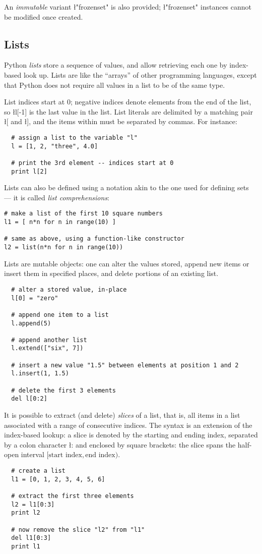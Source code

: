 An \emph{immutable} variant \l"frozenset" is also provided;
\l"frozenset" instances cannot be modified once created.

                                                               
\subsection{Lists}
\label{sec:lists}

Python \emph{lists} store a sequence of values, and allow retrieving
each one by index-based look up.  Lists are like the ``arrays'' of
other programming languages, except that Python does not require all
values in a list to be of the same type.

List indices start at 0; negative indices denote elements from the end
of the list, so \l{l[-1]} is the last value in the list.  List
literals are delimited by a matching pair \l{[} and \l{]}, and the
items within must be separated by commas. For instance:
\begin{lstlisting}
  # assign a list to the variable "l"
  l = [1, 2, "three", 4.0]

  # print the 3rd element -- indices start at 0
  print l[2]
\end{lstlisting}
Lists can also be defined using a notation akin to the one used for
defining sets --- it is called \emph{list comprehensions}:
\begin{lstlisting}
# make a list of the first 10 square numbers
l1 = [ n*n for n in range(10) ]

# same as above, using a function-like constructor
l2 = list(n*n for n in range(10))
\end{lstlisting}

Lists are mutable objects: one can alter the values stored, append new
items or insert them in specified places, and delete portions of an
existing list.
\begin{lstlisting}
  # alter a stored value, in-place
  l[0] = "zero"

  # append one item to a list
  l.append(5)

  # append another list
  l.extend(["six", 7])

  # insert a new value "1.5" between elements at position 1 and 2
  l.insert(1, 1.5)

  # delete the first 3 elements
  del l[0:2]
\end{lstlisting}
It is possible to extract (and delete) \emph{slices} of a list, that is,
all items in a list associated with a range of consecutive indices.
The syntax is an extension of the index-based lookup: a slice is
denoted by the starting and ending index, separated by a colon
character \l{:} and enclosed by square brackets: the slice spans the
half-open interval $[\text{start index}, \text{end index})$.
\begin{lstlisting}
  # create a list
  l1 = [0, 1, 2, 3, 4, 5, 6]

  # extract the first three elements
  l2 = l1[0:3]
  print l2

  # now remove the slice "l2" from "l1"
  del l1[0:3]
  print l1
\end{lstlisting}


